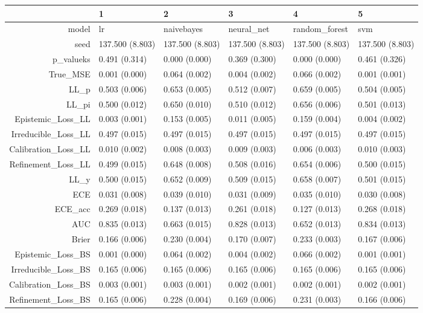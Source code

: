 \begin{table}[ht]
\centering
\begin{tabular}{rlllll}
  \hline
 & 1 & 2 & 3 & 4 & 5 \\ 
  \hline
model & lr & naivebayes & neural\_net & random\_forest & svm \\ 
  seed & 137.500 (8.803) & 137.500 (8.803) & 137.500 (8.803) & 137.500 (8.803) & 137.500 (8.803) \\ 
  p\_valueks & 0.491 (0.314) & 0.000 (0.000) & 0.369 (0.300) & 0.000 (0.000) & 0.461 (0.326) \\ 
  True\_MSE & 0.001 (0.000) & 0.064 (0.002) & 0.004 (0.002) & 0.066 (0.002) & 0.001 (0.001) \\ 
  LL\_p & 0.503 (0.006) & 0.653 (0.005) & 0.512 (0.007) & 0.659 (0.005) & 0.504 (0.005) \\ 
  LL\_pi & 0.500 (0.012) & 0.650 (0.010) & 0.510 (0.012) & 0.656 (0.006) & 0.501 (0.013) \\ 
  Epistemic\_Loss\_LL & 0.003 (0.001) & 0.153 (0.005) & 0.011 (0.005) & 0.159 (0.004) & 0.004 (0.002) \\ 
  Irreducible\_Loss\_LL & 0.497 (0.015) & 0.497 (0.015) & 0.497 (0.015) & 0.497 (0.015) & 0.497 (0.015) \\ 
  Calibration\_Loss\_LL & 0.010 (0.002) & 0.008 (0.003) & 0.009 (0.003) & 0.006 (0.003) & 0.010 (0.003) \\ 
  Refinement\_Loss\_LL & 0.499 (0.015) & 0.648 (0.008) & 0.508 (0.016) & 0.654 (0.006) & 0.500 (0.015) \\ 
  LL\_y & 0.500 (0.015) & 0.652 (0.009) & 0.509 (0.015) & 0.658 (0.007) & 0.501 (0.015) \\ 
  ECE & 0.031 (0.008) & 0.039 (0.010) & 0.031 (0.009) & 0.035 (0.010) & 0.030 (0.008) \\ 
  ECE\_acc & 0.269 (0.018) & 0.137 (0.013) & 0.261 (0.018) & 0.127 (0.013) & 0.268 (0.018) \\ 
  AUC & 0.835 (0.013) & 0.663 (0.015) & 0.828 (0.013) & 0.652 (0.013) & 0.834 (0.013) \\ 
  Brier & 0.166 (0.006) & 0.230 (0.004) & 0.170 (0.007) & 0.233 (0.003) & 0.167 (0.006) \\ 
  Epistemic\_Loss\_BS & 0.001 (0.000) & 0.064 (0.002) & 0.004 (0.002) & 0.066 (0.002) & 0.001 (0.001) \\ 
  Irreducible\_Loss\_BS & 0.165 (0.006) & 0.165 (0.006) & 0.165 (0.006) & 0.165 (0.006) & 0.165 (0.006) \\ 
  Calibration\_Loss\_BS & 0.003 (0.001) & 0.003 (0.001) & 0.002 (0.001) & 0.002 (0.001) & 0.002 (0.001) \\ 
  Refinement\_Loss\_BS & 0.165 (0.006) & 0.228 (0.004) & 0.169 (0.006) & 0.231 (0.003) & 0.166 (0.006) \\ 
   \hline
\end{tabular}
\end{table}
